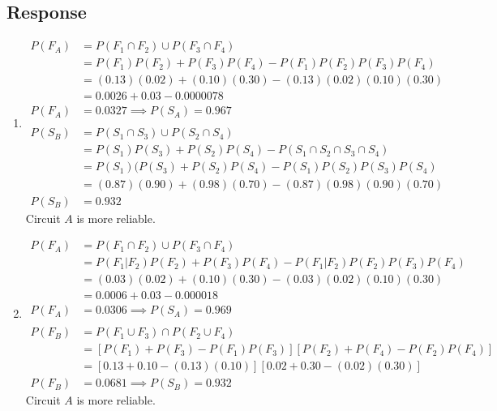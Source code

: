 \documentclass[13pt]{article}
\begin{document}
\subsection*{Response}
\begin{enumerate}[label=\textbf{\alph*.}]
\item
  \begin{align*}
    P(F_A) &= P(F_1 \cap F_2) \cup P(F_3 \cap F_4) \\
           &= P(F_1)P(F_2) + P(F_3)P(F_4) - P(F_1)P(F_2)P(F_3)P(F_4) \\
           &= (0.13)(0.02) + (0.10)(0.30) - (0.13)(0.02)(0.10)(0.30) \\
           &= 0.0026 + 0.03 - 0.0000078 \\
    P(F_A) &= 0.0327 \implies P(S_A) = 0.967 \\ \\
    P(S_B) &= P(S_1 \cap S_3) \cup P(S_2 \cap S_4) \\
           &= P(S_1)P(S_3) + P(S_2)P(S_4)  - P(S_1 \cap S_2 \cap S_3 \cap S_4) \\
           &= P(S_1)(P(S_3) + P(S_2)P(S_4)  - P(S_1)P(S_2)P(S_3)P(S_4) \\
           &= (0.87)(0.90) + (0.98)(0.70) - (0.87)(0.98)(0.90)(0.70) \\
    P(S_B) &= 0.932
  \end{align*}
  Circuit $A$ is more reliable.

\item
  \begin{align*}
    P(F_A) &= P(F_1 \cap F_2) \cup P(F_3 \cap F_4) \\
           &= P(F_1|F_2)P(F_2) + P(F_3)P(F_4) - P(F_1|F_2)P(F_2)P(F_3)P(F_4) \\
           &= (0.03)(0.02) + (0.10)(0.30) - (0.03)(0.02)(0.10)(0.30) \\
           &= 0.0006 + 0.03 - 0.000018 \\
    P(F_A) &= 0.0306 \implies P(S_A) = 0.969 \\ \\
    P(F_B) &= P(F_1 \cup F_3) \cap P(F_2 \cup F_4) \\
           &= [P(F_1) + P(F_3) - P(F_1)P(F_3)][P(F_2) + P(F_4) - P(F_2)P(F_4)] \\
           &= [0.13 + 0.10 - (0.13)(0.10)][0.02 + 0.30 - (0.02)(0.30)] \\
    P(F_B) &= 0.0681 \implies P(S_B) = 0.932
  \end{align*}
  Circuit $A$ is more reliable.
\end{enumerate}
\end{document}

